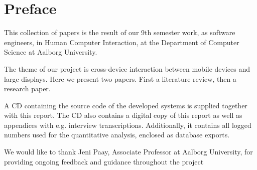 \section*{Preface}
This collection of papers is the result of our 9th semester work, as software engineers, in Human Computer Interaction, at the Department of Computer Science at Aalborg University.

The theme of our project is cross-device interaction between mobile devices and large displays. Here we present two papers. First a literature review, then a research paper. 

A CD containing the source code of the developed systems is supplied together with this report. The CD also contains a digital copy of this report as well as appendices with e.g. interview transcriptions. Additionally, it contains all logged numbers used for the quantitative analysis, enclosed as database exports.

We would like to thank Jeni Paay, Associate Professor at Aalborg University, for providing ongoing feedback and guidance throughout the project